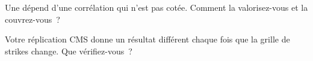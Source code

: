 \begin{interviewq}\label{iq:rc:convexity-adjustments-and-constant-maturity-products:5}
Une  dépend d'une corrélation qui n'est pas cotée. Comment la valorisez-vous
et la couvrez-vous~?
\end{interviewq}

\begin{interviewq}\label{iq:rc:convexity-adjustments-and-constant-maturity-products:6}
Votre réplication CMS donne un résultat différent chaque fois que la grille de strikes
change. Que vérifiez-vous~?
\end{interviewq}
